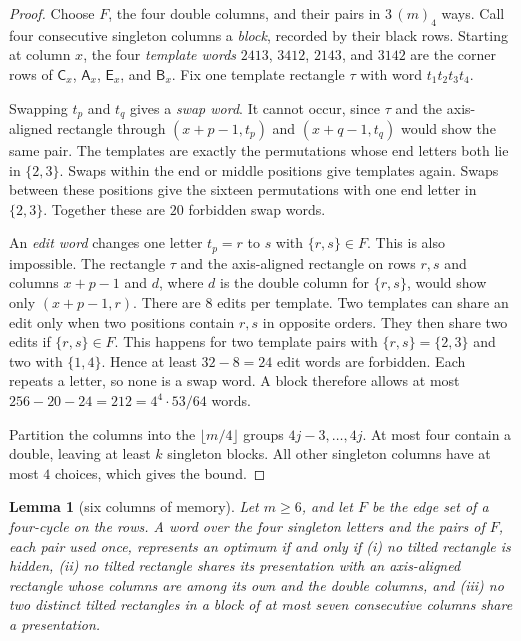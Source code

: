 \documentclass[12pt]{article}
\theoremstyle{plain}
\newtheorem{lemma}[theorem]{Lemma}
\theoremstyle{definition}
\theoremstyle{remark}
\newcommand{\kA}{\mathsf{A}}
\newcommand{\kB}{\mathsf{B}}
\newcommand{\kC}{\mathsf{C}}
\newcommand{\kE}{\mathsf{E}}
\begin{document}
\begin{proof}
Choose $F$, the four double columns, and their pairs in $3\,(m)_4$ ways. Call four consecutive singleton columns a
\emph{block}, recorded by their black rows. Starting at column $x$,
the four \emph{template words} $2413$, $3412$, $2143$, and $3142$
are the corner rows of $\kC_x$, $\kA_x$, $\kE_x$, and $\kB_x$.
Fix one template rectangle $\tau$ with word $t_1t_2t_3t_4$.

Swapping $t_p$ and $t_q$ gives a \emph{swap word}. It cannot occur,
since $\tau$ and the axis-aligned rectangle through $(x+p-1,t_p)$ and
$(x+q-1,t_q)$ would show the same pair. The templates are exactly the
permutations whose end letters both lie in $\{2,3\}$. Swaps within
the end or middle positions give templates again. Swaps between these
positions give the sixteen permutations with one end letter in
$\{2,3\}$. Together these are $20$ forbidden swap words.

An \emph{edit word} changes one letter $t_p=r$ to $s$ with
$\{r,s\}\in F$. This is also impossible. The rectangle $\tau$ and the
axis-aligned rectangle on rows $r,s$ and columns $x+p-1$ and $d$,
where $d$ is the double column for $\{r,s\}$, would show only
$(x+p-1,r)$. There are $8$ edits per template. Two templates can
share an edit only when two positions contain $r,s$ in opposite orders.
They then share two edits if $\{r,s\}\in F$. This happens for two
template pairs with $\{r,s\}=\{2,3\}$ and two with $\{1,4\}$.
Hence at least $32-8=24$ edit words are forbidden. Each repeats a letter, so none is a swap word. A block therefore
allows at most $256-20-24=212=4^4\cdot53/64$ words.

Partition the columns into the $\lfloor m/4\rfloor$ groups
$4j-3,\ldots,4j$. At most four contain a double, leaving at least
$k$ singleton blocks. All other singleton columns have at most $4$
choices, which gives the bound.
\end{proof}

\begin{lemma}[six columns of memory]\label{lem:fourmemory}
Let $m\ge6$, and let $F$ be the edge set of a four-cycle on the rows. A word over the
four singleton letters and the pairs of $F$, each pair used once, represents an optimum
if and only if (i) no tilted rectangle is hidden, (ii) no tilted rectangle shares its
presentation with an axis-aligned rectangle whose columns are among its own and the
double columns, and (iii) no two distinct tilted rectangles in a block of at most seven
consecutive columns share a presentation.
\end{lemma}
\end{document}
